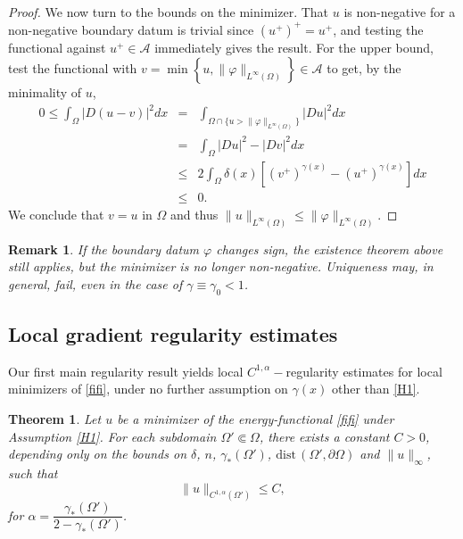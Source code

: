 \documentclass[reqno,11pt]{amsart}
\newtheorem{theorem}{Theorem}[section]
\newtheorem{remark}{Remark}[section]
\newcommand\dist{\mathrm{dist}\,}
\newcommand{\1}{\mathds{1}}
\numberwithin{equation}{section}
\begin{document}
\begin{proof}
We now turn to the bounds on the minimizer. That $u$ is non-negative for a non-negative boundary datum is trivial since $(u^+)^{+} = u^+$, and testing the functional against $u^+ \in \mathcal{A}$ immediately gives the result.
For the upper bound, test the functional with $v=\min \left\{u, \|\varphi\|_{L^\infty(\Omega)} \right\} \in  {\mathcal A} $ to get, by the minimality of $u$, 
\begin{eqnarray*}
0 \leq \int_{\Omega} \left| D (u-v) \right|^2 dx& = &  \int_{\Omega \cap \{ u> \| \varphi \|_{L^\infty(\Omega)} \} } \left| Du \right|^2 dx\\
& = & \int_{\Omega} \left| Du \right|^2 -  \left| Dv \right|^2 dx \\
& \leq & 2 \int_{\Omega}   \delta(x)  \left[ (v^+)^{\gamma(x)} -  (u^+)^{\gamma(x)} \right]dx\\
& \leq & 0.
\end{eqnarray*}
We conclude that $v=u$ in $\Omega$ and thus $\|u\|_{L^\infty(\Omega)} \le \|\varphi\|_{L^\infty(\Omega)}$.
\end{proof}

\begin{remark} If the boundary datum $\varphi$ changes sign, the existence theorem above still applies, but the minimizer is no longer non-negative. Uniqueness may, in general, fail, even in the case of $\gamma \equiv \gamma_0 <1$.
\end{remark}

\subsection{Local gradient regularity estimates}
Our first main regularity result yields local $C^{1,\alpha}-$regularity estimates for local minimizers of \eqref{fifi}, under no further assumption on $\gamma(x)$ other than \eqref{H1}.

\begin{theorem}\label{localregthm}
Let $u$ be a minimizer of the energy-functional \eqref{fifi} under Assumption \eqref{H1}. For each subdomain $\Omega' \Subset \Omega$, there exists a constant $C>0$, depending only on the bounds on $\delta$, $n$, $\gamma_\ast(\Omega')$, $\dist (\Omega',\partial \Omega)$ and $\|u\|_{\infty}$, such that
$$
\|u\|_{C^{1,\alpha}(\Omega')} \leq C,
$$
for $\alpha = \dfrac{\gamma_\ast(\Omega')}{2-\gamma_\ast(\Omega')}$.
\end{theorem}  
\end{document}
